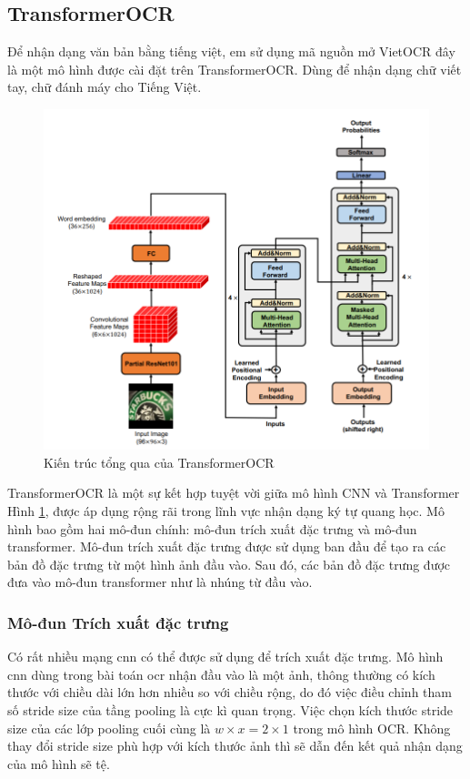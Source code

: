 \subsection{TransformerOCR} \label{transformerocr}
Để nhận dạng văn bản bằng tiếng việt, em sử dụng mã nguồn mở VietOCR đây là một mô hình được cài đặt trên TransformerOCR. Dùng để nhận dạng chữ viết tay, chữ đánh máy cho Tiếng Việt.

\begin{figure}[h]
    \includegraphics[scale=0.65]{chapter2/images/overview-transOCR.png}
    \centering
    \caption{Kiến trúc tổng qua của TransformerOCR \cite{feng2020scene}}
    \label{overview-transOCR}
\end{figure}

TransformerOCR là một sự kết hợp tuyệt vời giữa mô hình CNN và Transformer Hình \ref{overview-transOCR}, được áp dụng rộng rãi trong lĩnh vực nhận dạng ký tự quang học. Mô hình bao gồm hai mô-đun chính: mô-đun trích xuất đặc trưng và mô-đun transformer. Mô-đun trích xuất đặc trưng được sử dụng ban đầu để tạo ra các bản đồ đặc trưng từ một hình ảnh đầu vào. Sau đó, các bản đồ đặc trưng được đưa vào mô-đun transformer như là nhúng từ đầu vào.

\subsubsection*{Mô-đun Trích xuất đặc trưng}
Có rất nhiều mạng \acrshort*{cnn} có thể được sử dụng để trích xuất đặc trưng. Mô hình \acrshort*{cnn} dùng trong bài toán \acrshort*{ocr} nhận đầu vào là một ảnh, thông thường có kích thước với chiều dài lớn hơn nhiều so với chiều rộng, do đó việc điều chỉnh tham số stride size của tầng pooling là cực kì quan trọng. Việc chọn kích thước stride size của các lớp pooling cuối cùng là $w \times x = 2 \times 1$ trong mô hình OCR. Không thay đổi stride size phù hợp với kích thước ảnh thì sẽ dẫn đến kết quả nhận dạng của mô hình sẽ tệ.

